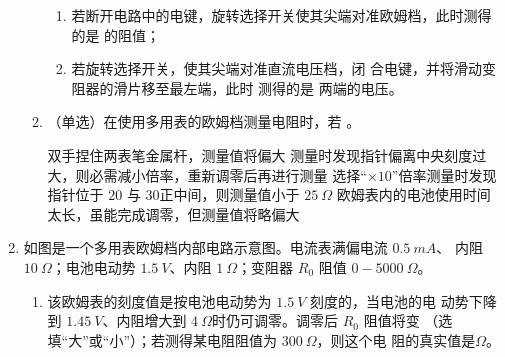 \begin{enumerate}
\begin{enumerate}
\begin{enumerate}
\item 
若断开电路中的电键，旋转选择开关使其尖端对准欧姆档，此时测得的是 \underlinegap 的阻值；

\item 
若旋转选择开关，使其尖端对准直流电压档，闭
合电键，并将滑动变阻器的滑片移至最左端，此时
测得的是 \underlinegap 两端的电压。

\end{enumerate}


\item 
（单选）在使用多用表的欧姆档测量电阻时，若 \underlinegap 。


\fourchoices
{双手捏住两表笔金属杆，测量值将偏大}
{测量时发现指针偏离中央刻度过大，则必需减小倍率，重新调零后再进行测量}
{选择“$ \times 10 $”倍率测量时发现指针位于 $ 20 $ 与 $ 30 $正中间，则测量值小于 $ 25 \ \Omega $}
{欧姆表内的电池使用时间太长，虽能完成调零，但测量值将略偏大}


\end{enumerate}




\item
{}
如图是一个多用表欧姆档内部电路示意图。电流表满偏电流 $ 0.5 \ mA $、
内阻 $ 10 \ \Omega $；电池电动势 $ 1.5 \ V $、内阻 $ 1 \ \Omega $；变阻器 $ R_{0} $ 阻值 $ 0-5000 \ \Omega $。
\begin{figure}[h!]
\centering

\end{figure}

\begin{enumerate}
\item
该欧姆表的刻度值是按电池电动势为 $ 1.5 \ V $ 刻度的，当电池的电
动势下降到 $ 1.45 \ V $、内阻增大到 $ 4 \ \Omega $时仍可调零。调零后 $ R_{0} $ 阻值将变 \underlinegap 
（选填“大”或“小”）；若测得某电阻阻值为 $ 300 \ \Omega $，则这个电
\underlinegap 
阻的真实值是$ \Omega $。


\end{enumerate}
\end{enumerate}
